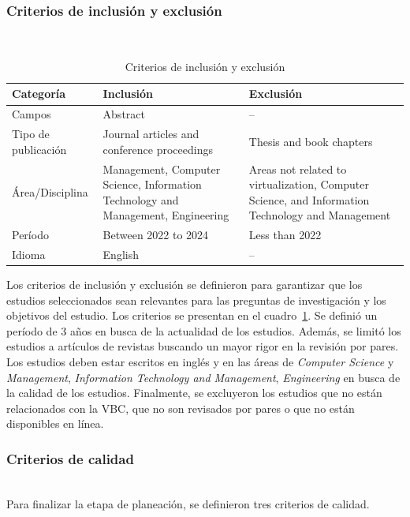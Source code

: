 \subsubsection{Criterios de inclusión y exclusión}
\mbox{}\\
\begin{table}[!t]
\centering
\renewcommand{\arraystretch}{1.4}
\begin{tabularx}{\textwidth}{>{\centering\arraybackslash}m{} >{\RaggedRight\arraybackslash}X >{\RaggedRight\arraybackslash}X}
\toprule
\textbf{Categoría} & \textbf{Inclusión} & \textbf{Exclusión} \\
\midrule
Campos & Abstract & -- \\
\midrule
Tipo de publicación & Journal articles and conference proceedings & Thesis and book chapters \\
\midrule
Área/Disciplina & Management, Computer Science, Information Technology and Management, Engineering & Areas not related to virtualization, Computer Science, and Information Technology and Management \\
\midrule
Período & Between 2022 to 2024 & Less than 2022 \\
\midrule
Idioma & English & -- \\
\bottomrule
\end{tabularx}
\caption{Criterios de inclusión y exclusión}\label{tab:criterios}
\end{table}
Los criterios de inclusión y exclusión se definieron para garantizar que los estudios seleccionados sean relevantes para las preguntas de investigación y los objetivos del estudio. Los criterios se presentan en el cuadro~\ref{tab:criterios}.
Se definió un período de 3 años en busca de la actualidad de los estudios. Además, se limitó los estudios a artículos de revistas buscando un mayor rigor en la revisión por pares. Los estudios deben estar escritos en inglés y en las áreas de \textit{Computer Science} y \textit{Management}, \textit{Information Technology and Management}, \textit{Engineering} en busca de la calidad de los estudios. Finalmente, se excluyeron los estudios que no están relacionados con la VBC, que no son revisados por pares o que no están disponibles en línea.\\

\subsubsection{Criterios de calidad}
\mbox{}\\
Para finalizar la etapa de planeación, se definieron tres criterios de calidad. \\

